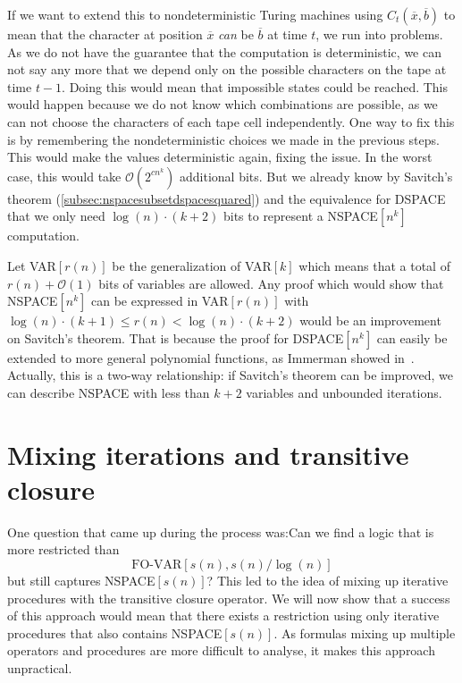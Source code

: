 If we want to extend this to nondeterministic Turing machines using $C_{t}(\overline{x}, \overline{b})$ to mean that the character at position $\overline{x}$ \emph{can} be $\overline{b}$ at time $t$, we run into problems.
As we do not have the guarantee that the computation is deterministic, we can not say any more that we depend only on the possible characters on the tape at time $t - 1$.
Doing this would mean that impossible states could be reached.
This would happen because we do not know which combinations are possible, as we can not choose the characters of each tape cell independently.
One way to fix this is by remembering the nondeterministic choices we made in the previous steps.
This would make the values deterministic again, fixing the issue.
In the worst case, this would take $\mathcal{O}(2^{cn^k})$ additional bits.
But we already know by Savitch's theorem (\cref{subsec:nspacesubsetdspacesquared}) and the equivalence for DSPACE that we only need $\log(n) \cdot (k + 2)$ bits to represent a NSPACE$[n^k]$ computation.

Let VAR$[r(n)]$ be the generalization of VAR$[k]$ which means that a total of $r(n) + \mathcal{O}(1)$ bits of variables are allowed.
Any proof which would show that NSPACE$[n^k]$ can be expressed in VAR$[r(n)]$ with $\log(n) \cdot (k + 1) \leq r(n) < \log(n) \cdot (k + 2)$ would be an improvement on Savitch's theorem.
That is because the proof for DSPACE$[n^k]$ can easily be extended to more general polynomial functions, as Immerman showed in~\cite{Immerman1999}.
Actually, this is a two-way relationship: if Savitch's theorem can be improved, we can describe NSPACE with less than $k + 2$ variables and unbounded iterations.




\section{Mixing iterations and transitive closure}\label{sec:mixing-iterations-and-transitive-closure}

One question that came up during the process was:Can we find a logic that is more restricted than \[\text{FO-VAR}[s(n), s(n)/\log(n)]\] but still captures NSPACE$[s(n)]$?
This led to the idea of mixing up iterative procedures with the transitive closure operator.
We will now show that a success of this approach would mean that there exists a restriction using only iterative procedures that also contains NSPACE$[s(n)]$.
As formulas mixing up multiple operators and procedures are more difficult to analyse, it makes this approach unpractical.

